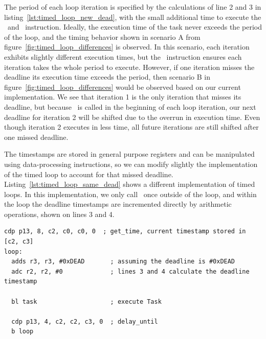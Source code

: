 The period of each loop iteration is specified by the calculations of line 2 and 3 in listing~\ref{lst:timed_loop_new_dead}, with the small additional time to execute the \gettime\ and \delayuntil\ instruction. 
Ideally, the execution time of the task never exceeds the period of the loop, and the timing behavior shown in scenario A from figure~\ref{fig:timed_loop_differences} is observed. 
In this scenario, each iteration exhibits slightly different execution times, but the \delayuntil\ instruction ensures each iteration takes the whole period to execute.
However, if one iteration misses the deadline its execution time exceeds the period, then scenario B in figure~\ref{fig:timed_loop_differences} would be observed based on our current implementation.
We see that iteration 1 is the only iteration that misses its deadline, but because \gettime\ is called in the beginning of each loop iteration, our next deadline for iteration 2 will be shifted due to the overrun in execution time. 
Even though iteration 2 executes in less time, all future iterations are still shifted after one missed deadline.

The timestamps are stored in general purpose registers and can be manipulated using data-processing instructions, so we can modify slightly the implementation of the timed loop to account for that missed deadline. 
Listing~\ref{lst:timed_loop_same_dead} shows a different implementation of timed loops.
In this implementation, we only call \gettime\ once outside of the loop, and within the loop the deadline timestamps are incremented directly by arithmetic operations, shown on lines 3 and 4.    

\begin{lstlisting}[float=h, label=lst:timed_loop_same_dead,caption=Timed loops with get\_time outside of the loop ]
  cdp p13, 8, c2, c0, c0, 0  ; get_time, current timestamp stored in [c2, c3]
loop:
  adds r3, r3, #0xDEAD       ; assuming the deadline is #0xDEAD
  adc r2, r2, #0             ; lines 3 and 4 calculate the deadline timestamp
   
  bl task                    ; execute Task
  
  cdp p13, 4, c2, c2, c3, 0  ; delay_until 
  b loop
\end{lstlisting}

